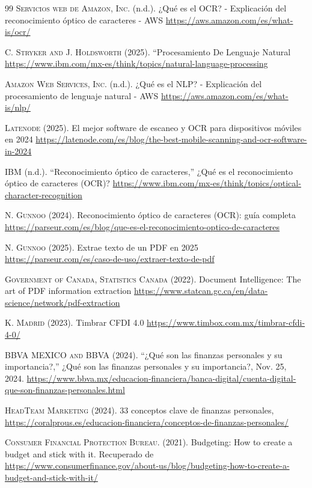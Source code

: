 \begin{thebibliography}{99}
\textsc{Servicios web de Amazon, Inc.} (n.d.). ¿Qué es el OCR? - Explicación del reconocimiento óptico de caracteres - AWS
\url{https://aws.amazon.com/es/what-is/ocr/}

\textsc{C. Stryker and J. Holdsworth} (2025). “Procesamiento De Lenguaje Natural
\url{https://www.ibm.com/mx-es/think/topics/natural-language-processing}

\textsc{Amazon Web Services, Inc.} (n.d.). ¿Qué es el NLP? - Explicación del procesamiento de lenguaje natural - AWS
\url{https://aws.amazon.com/es/what-is/nlp/}

\textsc{Latenode} (2025). El mejor software de escaneo y OCR para dispositivos móviles en 2024
\url{https://latenode.com/es/blog/the-best-mobile-scanning-and-ocr-software-in-2024}

\textsc{IBM} (n.d.).  “Reconocimiento óptico de caracteres,” ¿Qué es el reconocimiento óptico de caracteres (OCR)? 
\url{https://www.ibm.com/mx-es/think/topics/optical-character-recognition}

\textsc{N. Gunnoo} (2024). Reconocimiento óptico de caracteres (OCR): guía completa
\url{https://parseur.com/es/blog/que-es-el-reconocimiento-optico-de-caracteres}

\textsc{N. Gunnoo} (2025). Extrae texto de un PDF en 2025
\url{https://parseur.com/es/caso-de-uso/extraer-texto-de-pdf}

\textsc{Government of Canada, Statistics Canada} (2022). Document Intelligence: The art of PDF information extraction
\url{https://www.statcan.gc.ca/en/data-science/network/pdf-extraction}

\textsc{K. Madrid} (2023). Timbrar CFDI 4.0
\url{https://www.timbox.com.mx/timbrar-cfdi-4-0/}

\textsc{BBVA MEXICO and BBVA} (2024). “¿Qué son las finanzas personales y su importancia?,” ¿Qué son las finanzas personales y su importancia?, Nov. 25, 2024.
\url{https://www.bbva.mx/educacion-financiera/banca-digital/cuenta-digital-que-son-finanzas-personales.html}

\textsc{HeadTeam Marketing} (2024). 33 conceptos clave de finanzas personales,
\url{https://coralprous.es/educacion-financiera/conceptos-de-finanzas-personales/}

\textsc{Consumer Financial Protection Bureau.} (2021). Budgeting: How to create a budget and stick with it. Recuperado de \url{https://www.consumerfinance.gov/about-us/blog/budgeting-how-to-create-a-budget-and-stick-with-it/}


\end{thebibliography}
